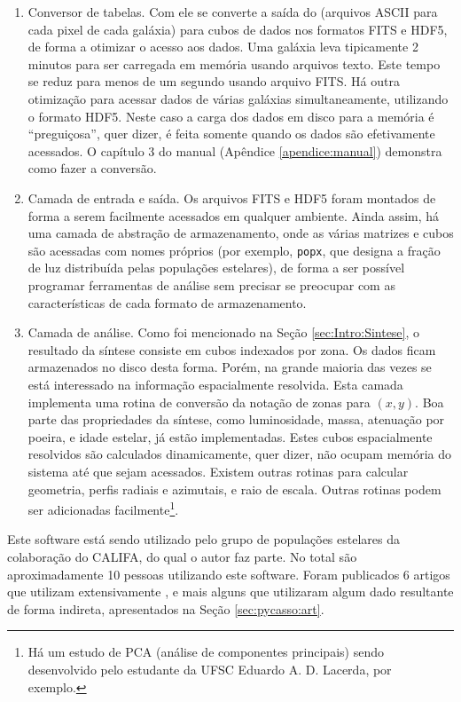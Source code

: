 \begin{enumerate}

\item Conversor de tabelas. Com ele se converte a saída do \starlight (arquivos
ASCII para cada pixel de cada galáxia) para cubos de dados nos formatos FITS e
HDF5, de forma a otimizar o acesso aos dados. Uma galáxia leva tipicamente 2
minutos para ser carregada em memória usando arquivos texto. Este tempo se reduz
para menos de um segundo usando arquivo FITS. Há outra otimização para acessar
dados de várias galáxias simultaneamente, utilizando o formato HDF5. Neste caso
a carga dos dados em disco para a memória é ``preguiçosa'', quer dizer, é feita
somente quando os dados são efetivamente acessados. O capítulo 3 do manual
(Apêndice \ref{apendice:manual}) demonstra como fazer a conversão.

\item Camada de entrada e saída. Os arquivos FITS e HDF5 foram montados de forma
a serem facilmente acessados em qualquer ambiente. Ainda assim, há uma camada de
abstração de armazenamento, onde as várias matrizes e cubos são acessadas com
nomes próprios (por exemplo, \texttt{popx}, que designa a fração de luz
distribuída pelas populações estelares), de forma a ser possível programar
ferramentas de análise sem precisar se preocupar com as características de cada
formato de armazenamento.

\item Camada de análise. Como foi mencionado na Seção \ref{sec:Intro:Sintese}, o
resultado da síntese consiste em cubos indexados por zona. Os dados ficam
armazenados no disco desta forma. Porém, na grande maioria das vezes se está
interessado na informação espacialmente resolvida. Esta camada implementa uma
rotina de conversão da notação de zonas para $(x, y)$. Boa parte das
propriedades da síntese, como luminosidade, massa, atenuação por poeira, e idade
estelar, já estão implementadas. Estes cubos espacialmente resolvidos são
calculados dinamicamente, quer dizer, não ocupam memória do sistema até que
sejam acessados. Existem outras rotinas para calcular geometria, perfis radiais
e azimutais, e raio de escala. Outras rotinas podem ser adicionadas
facilmente\footnote{Há um estudo de PCA (análise de componentes principais)
sendo desenvolvido pelo estudante da UFSC Eduardo A. D. Lacerda, por
exemplo.}.

\end{enumerate}

Este software está sendo utilizado pelo grupo de populações estelares da
colaboração do CALIFA, do qual o autor faz parte. No total são aproximadamente
10 pessoas utilizando este software. Foram publicados 6 artigos que utilizam
extensivamente \pycasso, e mais alguns que utilizaram algum dado resultante de
forma indireta, apresentados na Seção \ref{sec:pycasso:art}.


